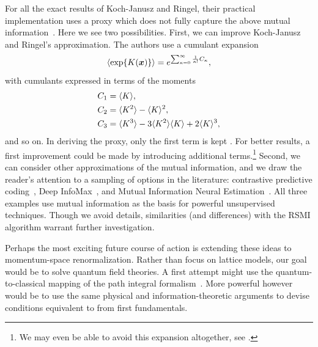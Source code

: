 For all the exact results of Koch-Janusz and Ringel, their practical
implementation uses a proxy which does not fully capture the above
mutual information~\cite{kjr}. Here we see two possibilities. First, we can
improve Koch-Janusz and Ringel's approximation. The authors use a
cumulant expansion
\begin{equation}%
  \expect{\exp\{K(\bx)\}}=e^{\sum_{\k=0}^\infty\frac{1}{\k!} C_{\k}},
\end{equation}%
with cumulants expressed in terms of the moments
\begin{align}%
  C_1&=\expect{K},\\
  C_2&=\expect{K^2}-\expect{K}^2,\\
  C_3&=\expect{K^3}-3\expect{K^2}\expect{K}+2\expect{K}^3,\\
\end{align}%
and so on. In deriving the proxy, only the first term is kept
. For better results, a first improvement could be
made by introducing additional terms.\footnote{We may even be able to
  avoid this expansion altogether, see .} Second,
we can consider other approximations of the mutual information, and we
draw the reader's attention to a sampling of options in the
literature: contrastive predictive coding~\cite{oord}, Deep
InfoMax~\cite{hjelm}, and Mutual Information Neural
Estimation~\cite{belghazi}. All three examples use mutual information
as the basis for powerful unsupervised techniques. Though we avoid
details, similarities (and differences) with the RSMI algorithm
warrant further investigation.

Perhaps the most exciting future course of action is extending these
ideas to momentum-space renormalization. Rather than focus on lattice
models, our goal would be to solve quantum field theories. A first
attempt might use the quantum-to-classical mapping of the path
integral formalism~\cite{kjr}. More powerful however would be to use
the same physical and information-theoretic arguments to devise
conditions equivalent to  from first fundamentals.
